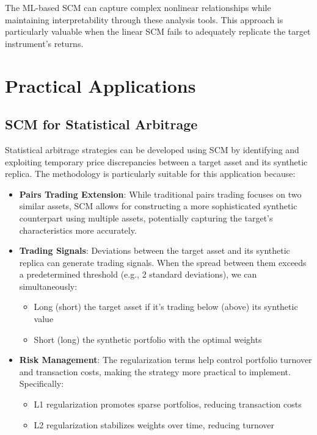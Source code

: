 The ML-based SCM can capture complex nonlinear relationships while maintaining interpretability through these analysis tools. This approach is particularly valuable when the linear SCM fails to adequately replicate the target instrument's returns.



\section{Practical Applications}

\subsection{SCM for Statistical Arbitrage}
Statistical arbitrage strategies can be developed using SCM by identifying and exploiting temporary price discrepancies between a target asset and its synthetic replica. The methodology is particularly suitable for this application because:

\begin{itemize}
    \item \textbf{Pairs Trading Extension}: While traditional pairs trading focuses on two similar assets, SCM allows for constructing a more sophisticated synthetic counterpart using multiple assets, potentially capturing the target's characteristics more accurately.
    
    \item \textbf{Trading Signals}: Deviations between the target asset and its synthetic replica can generate trading signals. When the spread between them exceeds a predetermined threshold (e.g., 2 standard deviations), we can simultaneously:
    \begin{itemize}
        \item Long (short) the target asset if it's trading below (above) its synthetic value
        \item Short (long) the synthetic portfolio with the optimal weights
    \end{itemize}
    
    \item \textbf{Risk Management}: The regularization terms help control portfolio turnover and transaction costs, making the strategy more practical to implement. Specifically:
    \begin{itemize}
        \item L1 regularization promotes sparse portfolios, reducing transaction costs
        \item L2 regularization stabilizes weights over time, reducing turnover
    \end{itemize}
\end{itemize}

